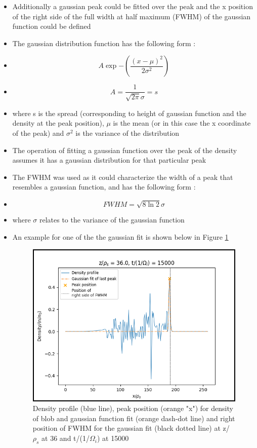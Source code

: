 \documentclass{article}
\begin{document}
\begin{arrowlist}
\begin{itemize}
\begin{itemize}
                \item Additionally a gaussian peak could be fitted over the peak and the x position of the right side of the full width at half maximum (FWHM) of the gaussian function could be 
                defined
                \item The gaussian distribution function has the following form \cite{chirikjian_gaussian_2009}:
                \item[] \[ A\exp{-\left(\frac{\left(x-\mu\right)^2}{2\sigma^2}\right)} \]
                \item[] \[ A = \frac{1}{\sqrt{2\pi}\sigma}=s\]
                \item where s is the spread (corresponding to height of gaussian function and the density at the peak position), $\mu$ is the mean (or in this case the x coordinate of the peak) and $\sigma^2$ is the variance of the distribution 
                \item The operation of fitting a gaussian function over the peak of the density assumes it has a gaussian distribution for that particular peak
                \item The FWHM was used as it could characterize the width of a peak that resembles a gaussian function, and has the following form \cite{rainio_methods_2025}:
                \item[] \[ FWHM = \sqrt{8\ln{2}}\sigma \]
                \item where $\sigma$ relates to the variance of the gaussian function
                \item An example for one of the the gaussian fit is shown below in Figure \ref{fig:fig10}

    \begin{figure}[H]
        \centering
        \includegraphics[height=0.4\textheight]{./Fig/Fig10 n front FWHM plot.png}
        \normalsize{\caption{Density profile (blue line), peak position (orange "x") for density of blob and gaussian function fit (orange dash-dot line) and right position of FWHM for the gaussian fit (black dotted line) at z/$\rho_s$ at 36 and t/(1/$\Omega_i$) at 15000}
        \label{fig:fig10}}
    \end{figure}  


\end{itemize}
\end{itemize}
\end{arrowlist}
\end{document}
